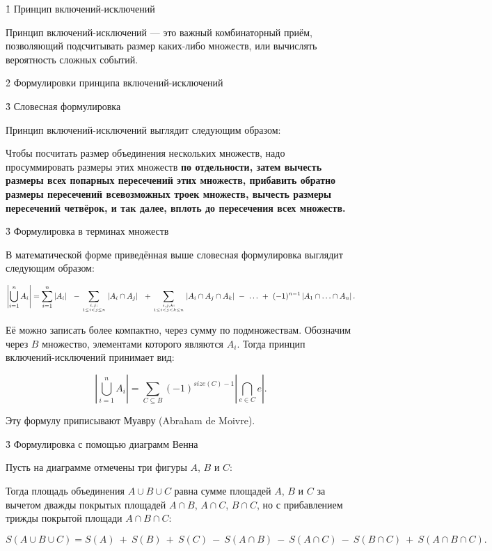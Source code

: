 \h1{ Принцип включений-исключений }

Принцип включений-исключений --- это важный комбинаторный приём, позволяющий подсчитывать размер каких-либо множеств, или вычислять вероятность сложных событий.


\h2{ Формулировки принципа включений-исключений }


\h3{ Словесная формулировка }

Принцип включений-исключений выглядит следующим образом:

Чтобы посчитать размер объединения нескольких множеств, надо просуммировать размеры этих множеств \bf{по отдельности}, затем вычесть размеры всех \bf{попарных} пересечений этих множеств, прибавить обратно размеры пересечений всевозможных \bf{троек} множеств, вычесть размеры пересечений \bf{четвёрок}, и так далее, вплоть до пересечения \bf{всех} множеств.


\h3{ Формулировка в терминах множеств }

В математической форме приведённая выше словесная формулировка выглядит следующим образом:

$$ \left| \bigcup_{i=1}^n A_i \right| = \sum_{i=1}^n \left| A_i \right| ~~ - \sum_{i,j : \atop 1 \le i < j \le n} \left| A_i \cap A_j \right| ~~ + \sum_{i,j,k : \atop 1 \le i < j < k \le n} \left| A_i \cap A_j \cap A_k \right| ~ - ~ \ldots ~ + ~ (-1)^{n-1} \left| A_1 \cap \ldots \cap A_n \right|. $$

Её можно записать более компактно, через сумму по подмножествам. Обозначим через $B$ множество, элементами которого являются $A_i$. Тогда принцип включений-исключений принимает вид:

$$ \left| \bigcup_{i=1}^n A_i \right| = \sum_{C \subseteq B} (-1)^{size(C)-1} \left| \bigcap_{e \in C} e \right|. $$

Эту формулу приписывают Муавру (Abraham de Moivre).


\h3{ Формулировка с помощью диаграмм Венна }

Пусть на диаграмме отмечены три фигуры $A$, $B$ и $C$:


Тогда площадь объединения $A \cup B \cup C$ равна сумме площадей $A$, $B$ и $C$ за вычетом дважды покрытых площадей $A \cap B$, $A \cap C$, $B \cap C$, но с прибавлением трижды покрытой площади $A \cap B \cap C$:

$$ S(A \cup B \cup C) = S(A) ~ + ~ S(B) ~ + ~ S(C) ~ - ~ S(A \cap B) ~ - ~ S(A \cap C) ~ - ~ S(B \cap C) ~ + ~ S(A \cap B \cap C). $$

